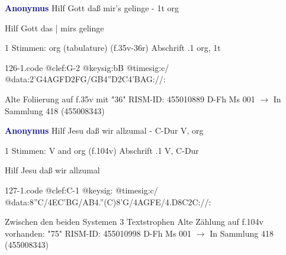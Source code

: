 \documentclass[twocolumn]{book}
\begin{document}
\newline \par \vspace{7pt} \textcolor{darkblue}{\textbf{Anonymus  }}
\newline Hilf Gott daß mir's gelinge - 1t
\newline org
\newline \begin{itshape}[f.35v, at left:] Hilf Gott das | mirs gelinge\end{itshape} 
\newline \textcolor{darkblue}{}  1 Stimmen: org (tabulature)  (f.35v-36r)
\newline Abschrift
.1  org, 1t  
\begin{filecontents*}{126-1.code}
@clef:G-2
@keysig:bB
@timesig:c/
@data:2'G4AGFD2FG/GB4''D2C4'BAG://:
\end{filecontents*}
\newline
%
\newline Alte Foliierung auf f.35v mit "36"
\newline RISM-ID: 455010889
\newline D-Fh  Ms 001
\newline $\rightarrow$ In Sammlung 418 (455008343)
      
\newline \par \vspace{7pt} \textcolor{darkblue}{\textbf{Anonymus  }}
\newline Hilf Jesu daß wir allzumal - C-Dur
\newline V, org
\newline \begin{itshape}\end{itshape} 
\newline \textcolor{darkblue}{}  1 Stimmen: V and org  (f.104v)
\newline Abschrift
.1  V, C-Dur
\newline \begin{footnotesize} Hilf Jesu daß wir allzumal \end{footnotesize}  
\begin{filecontents*}{127-1.code}
@clef:C-1
@keysig:
@timesig:c/
@data:8''C/4EC'BG/AB4.''(C)8'G/4AGFE/4.D8C2C://:
\end{filecontents*}
\newline
%
\newline Zwischen den beiden Systemen 3 Textstrophen
\newline Alte Zählung auf f.104v vorhanden: "75"
\newline RISM-ID: 455010998
\newline D-Fh  Ms 001
\newline $\rightarrow$ In Sammlung 418 (455008343)
      
\end{document}
